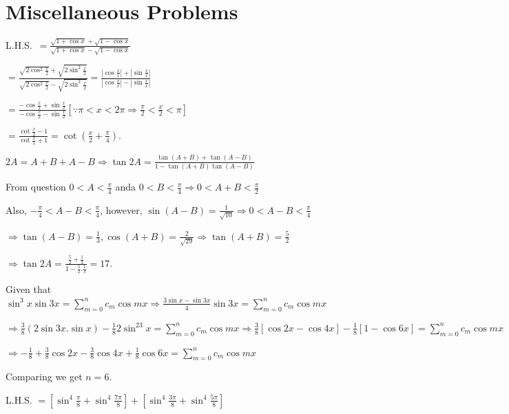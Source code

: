 \chapter{Miscellaneous Problems}
\startitemize[n, 1*broad]
\item L.H.S.\ $= \frac{\sqrt{1 + \cos x} + \sqrt{1 - \cos x}}{\sqrt{1 + \cos x} - \sqrt{1 - \cos x}}$

  $= \frac{\sqrt{2\cos^2\frac{x}{2}} + \sqrt{2\sin^2\frac{x}{2}}}{\sqrt{2\cos^2\frac{x}{2}}
  - \sqrt{2\sin^2\frac{x}{2}}} = \frac{\left|\cos\frac{x}{x}\right|
  + \left|\sin\frac{x}{x}\right|}{\left|\cos\frac{x}{x}\right| - \left|\sin\frac{x}{x}\right|}$

  $= \frac{-\cos\frac{x}{2} + \sin\frac{x}{2}}{-\cos\frac{x}{2} - \sin\frac{x}{2}}[\because \pi < x <
  2\pi\Rightarrow \frac{\pi}{2} < \frac{x}{2} < \pi]$

  $= \frac{\cot\frac{x}{2} - 1}{\cot\frac{x}{2} + 1} = \cot\left(\frac{x}{2} + \frac{\pi}{4}\right)$.
\item $2A = A + B + A - B \Rightarrow \tan2A = \frac{\tan(A + B) + \tan(A - B)}{1 - \tan(A + B)\tan(A - B)}$

  From question $0 < A < \frac{\pi}{4}$ anda $0 < B < \frac{\pi}{4} \Rightarrow 0 < A + B < \frac{\pi}{2}$

  Also, $-\frac{\pi}{4} < A - B < \frac{\pi}{4}$, however, $\sin(A - B) = \frac{1}{\sqrt{10}}\Rightarrow 0 <
  A - B < \frac{\pi}{4}$

  $\Rightarrow \tan(A - B) = \frac{1}{3}, \cos(A + B) = \frac{2}{\sqrt{29}}\Rightarrow \tan(A + B)
  = \frac{5}{2}$

  $\Rightarrow \tan2A = \frac{\frac{5}{2} + \frac{1}{3}}{1 - \frac{5}{2}.\frac{1}{3}} = 17$.
\item Given that $\sin^3x\sin3x = \displaystyle\sum_{m = 0}^nc_m\cos mx \Rightarrow \frac{3\sin x
  - \sin3x}{4}\sin3x = \displaystyle\sum_{m = 0}^nc_m\cos mx$

  $\Rightarrow \frac{3}{8}(2\sin3x.\sin x) - \frac{1}{8}2\sin^23x = \displaystyle\sum_{m = 0}^nc_m\cos
  mx \Rightarrow \frac{3}{8}[\cos2x - \cos4x] - \frac{1}{8}[1 - \cos6x] = \displaystyle\sum_{m = 0}^nc_m\cos
  mx$

  $\Rightarrow -\frac{1}{8} + \frac{3}{8}\cos2x - \frac{3}{8}\cos4x + \frac{1}{8}\cos6x
  = \displaystyle\sum_{m = 0}^nc_m\cos mx$

  Comparing we get $n = 6$.
\item L.H.S. $= \left[\sin^4\frac{\pi}{8} + \sin^4\frac{7\pi}{8}\right] + \left[\sin^4\frac{3\pi}{8}
  + \sin^4\frac{5\pi}{8}\right]$

